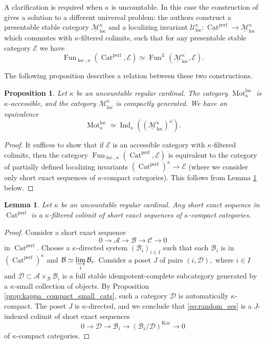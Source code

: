 \documentclass[11pt,leqno]{amsart}
\newtheorem{lemma}[theo]{Lemma}
\newtheorem{prop}[theo]{Proposition}
\numberwithin{equation}{section}
\newcommand{\indlim}[1][]{\mathop{\varinjlim}\limits_{#1}}
\newcommand{\Mot}{\operatorname{Mot}}
\newcommand{\Cat}{\operatorname{Cat}}
\newcommand{\loc}{\operatorname{loc}}
\newcommand{\cM}{{\mathcal M}}
\newcommand{\cD}{{\mathcal D}}
\newcommand{\cA}{{\mathcal A}}
\newcommand{\cB}{{\mathcal B}}
\newcommand{\cC}{{\mathcal C}}
\newcommand{\cE}{{\mathcal E}}
\newcommand{\cU}{{\mathcal U}}
\newcommand{\un}{\underline}
\newcommand{\Fun}{\operatorname{Fun}}
\newcommand{\perf}{\operatorname{perf}}
\newcommand{\Kar}{\operatorname{Kar}}
\newcommand{\Ind}{\operatorname{Ind}}
\begin{document}
A clarification is required when $\kappa$ is uncountable. In this case the construction of \cite[Section 8.2]{BGT} gives a solution to a different universal problem: the authors construct a presentable stable category $\un{\cM}_{\loc}^{\kappa}$ and a localizing invariant $\cU^{\kappa}_{\loc}:\Cat^{\perf}\to\un{\cM}_{\loc}^{\kappa}$ which commutes with $\kappa$-filtered colimits, such that for any presentable stable category $\cE$ we have
$$\Fun_{\loc,\kappa}(\Cat^{\perf},\cE)\simeq \Fun^{L}(\un{\cM}_{\loc}^{\kappa},\cE).$$

The following proposition describes a relation between these two constructions.

\begin{prop}Let $\kappa$ be an uncountable regular cardinal. The category $\Mot^{\loc}_{\kappa}$ is $\kappa$-accessible, and the category $\un{\cM}_{\loc}^{\kappa}$ is compactly generated. We have an equivalence $$\Mot^{\loc}_{\kappa}\simeq \Ind_{\kappa}((\un{\cM}_{\loc}^{\kappa})^{\omega}).$$\end{prop} 

\begin{proof}It suffices to show that if $\cE$ is an accessible category with $\kappa$-filtered colimits, then the category $\Fun_{\loc,\kappa}(\Cat^{\perf},\cE)$ is equivalent to the category of partially defined localizing invariants $(\Cat^{\perf})^{\kappa}\to\cE$ (where we consider only short exact sequences of $\kappa$-compact categories). This follows from Lemma \ref{lem:approximating_ses} below.
\end{proof}

\begin{lemma}\label{lem:approximating_ses} Let $\kappa$ be an uncountable regular cardinal. Any short exact sequence in $\Cat^{\perf}$ is a $\kappa$-filtered colimit of short exact sequences of $\kappa$-compact categories.\end{lemma}

\begin{proof} Consider a short exact sequence 
\begin{equation}\label{eq:random_ses} 0\to\cA\to\cB\to\cC\to 0\end{equation}
 in $\Cat^{\perf}.$ Choose a $\kappa$-directed system $(\cB_i)_{i\in I}$ such that each $\cB_i$ is in $(\Cat^{\perf})^{\kappa}$ and $\cB\simeq\indlim[i]\cB_i.$ Consider a poset $J$ of pairs $(i,\cD),$ where $i\in I$ and $\cD\subset \cA\times_{\cB}\cB_i$ is a full stable idempotent-complete subcategory generated by a $\kappa$-small collection of objects. By Proposition \ref{prop:kappa_compact_small_cats}, such a category $\cD$ is automatically $\kappa$-compact. The poset $J$ is $\kappa$-directed, and we conclude that \eqref{eq:random_ses} is a $J$-indexed colimit of short exact sequences
$$0\to\cD\to\cB_i\to (\cB_i/\cD)^{\Kar}\to 0$$
of $\kappa$-compact categories.
\end{proof}
\end{document}
